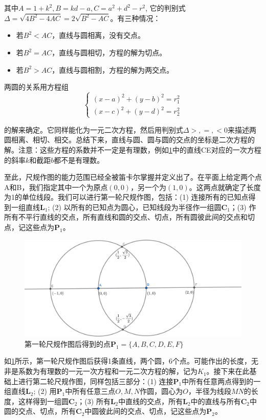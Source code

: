 \documentclass[b5paper]{ctexart}
\begin{document}
其中$A = 1 + k^2, B = kd - a, C = a^2 + d^2 - r^2$, 它的判别式$\Delta = \sqrt{4B^2 - 4AC} = 2\sqrt{B^2 - AC}$。有三种情况：
\begin{itemize}
\item 若$B^2 < AC$，直线与圆相离，没有交点。
\item 若$B^2 = AC$，直线与圆相切，方程的解为切点。
\item 若$B^2 > AC$，直线与圆相割，方程的解为两交点。
\end{itemize}

两圆的关系用方程组
\[
\begin{cases}
(x - a)^2 + (y - b)^2 = r_1^2 \\
(x - c)^2 + (y - d)^2 = r_2^2
\end{cases}
\]

的解来确定。它同样能化为一元二次方程，然后用判别式$\Delta >, =, < 0$来描述两圆相离、相切、相交。总结下来，直线与圆、圆与圆的交点的坐标是二次方程的解。注意：这些方程的系数并不一定是有理数，例如\cref{fig:P1}中的直线CE对应的一次方程的斜率$k$和截距$b$都不是有理数。

至此，尺规作图的能力范围已经全被笛卡尔掌握并定义出了。在平面上给定两个点A和B，我们指定其中一个为原点$(0, 0)$，另一个为$(1, 0)$。这两点就确定了长度为1的单位线段。我们可以进行第一轮尺规作图，包括：(1) 连接所有的已知点得到一组直线$\mathbf{L}_1$; (2) 以所有的已知点为圆心，已知线段为半径作一组圆$\mathbf{C}_1$；(3) 作所有不平行直线的交点，所有直线和圆的交点、切点，所有圆彼此间的交点和切点，记这些点为$\mathbf{P}_1$。

\begin{figure}[htbp]
 \centering
 \includegraphics[scale=0.35]{img/P1}
 \caption{第一轮尺规作图后得到的点$\mathbf{P}_1 = \{A, B, C, D, E, F\}$}
 \label{fig:P1}
\end{figure}

如\cref{fig:P1}所示，第一轮尺规作图后获得1条直线，两个圆，6个点。可能作出的长度，无非是系数为有理数的一元一次方程和一元二次方程的解，记为$K_1$。接下来在此基础上进行第二轮尺规作图，同样包括三部分：(1) 连接$\mathbf{P}_1$中所有任意两点得到的一组直线$\mathbf{L}_2$; (2) 用$\mathbf{P}_1$中所有任意三点$O, M, N$作圆，圆心为$O$，半径为线段$MN$的长度，这样得到一组圆$\mathbf{C}_2$；(3) 所有$\mathbf{L}_2$中直线的交点，所有$\mathbf{L}_2$中的直线与所有$\mathbf{C}_2$中圆的交点、切点，所有$\mathbf{C}_2$中圆彼此间的交点、切点，记这些点为$\mathbf{P}_2$。
\end{document}
